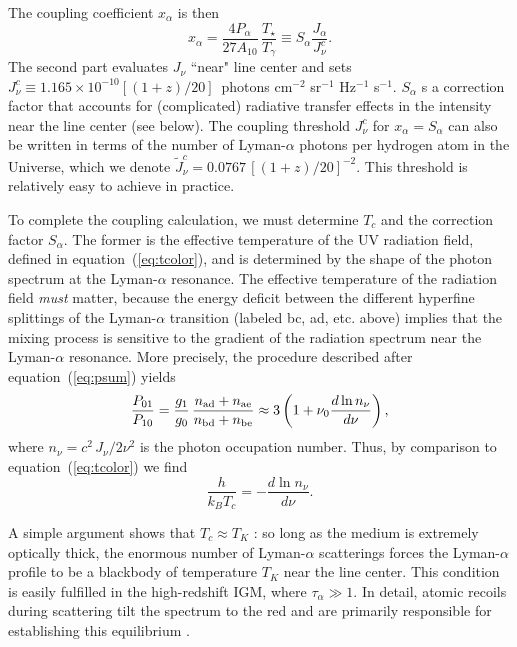 The coupling coefficient $x_\alpha$ is then
\begin{equation}
x_\alpha = \frac{4 P_\alpha}{27 A_{10}} \, \frac{T_\star}{T_{\gamma}} \equiv S_\alpha \frac{J_\alpha}{J_\nu^c}.
\label{eq:xalpha}
\end{equation}
The second part evaluates $J_\nu$ ``near" line center and sets $J_\nu^c \equiv 1.165 \times 10^{-10} [(1+z)/20]$~photons cm$^{-2}$ sr$^{-1}$ Hz$^{-1}$ s$^{-1}$.   $S_\alpha$ s a correction factor that accounts for (complicated) radiative transfer effects in the intensity near the line center (see below).  The coupling threshold $J_\nu^c$ for $x_\alpha = S_\alpha$ can also be written in terms of the number of Lyman-$\alpha$ photons per hydrogen atom in the Universe, which we denote $\tilde{J}_\nu^c = 0.0767 \, [(1+z)/20]^{-2}$.  This threshold is relatively easy to achieve in practice.

To complete the coupling calculation, we must determine $T_c$ and the correction factor $S_\alpha$.  The former is the effective temperature of the UV radiation field, defined in equation~(\ref{eq:tcolor}), and is determined by the shape of the photon spectrum at the Lyman-$\alpha$ resonance. The effective temperature of the radiation field \emph{must} matter, because the energy deficit between the different hyperfine splittings of the Lyman-$\alpha$ transition (labeled bc, ad, etc. above) implies that the mixing process is sensitive to the gradient of the radiation spectrum near the Lyman-$\alpha$ resonance.  More precisely, the procedure described after equation~(\ref{eq:psum}) yields
\begin{equation}
\frac{P_{01}}{P_{10}} = \frac{g_1}{g_0} \, \frac{n_{\rm ad} + n_{\rm ae}}{n_{\rm bd} + n_{\rm be}} \approx 3 \left( 1 + \nu_0 \frac{d \ln n_\nu}{d \nu} \right),
\label{eq:tcrad1}
\end{equation}
where $n_\nu = c^2 \, J_\nu/2 \nu^2$ is the photon occupation number.
Thus, by comparison to equation~(\ref{eq:tcolor}) we find
\begin{equation}
\frac{h}{k_B T_c} = - \frac{d \ln n_\nu}{d \nu}.
\label{eq:tcrad}
\end{equation}

A simple argument shows that $T_c \approx T_K$ \cite{field59-ts}: so long as the medium is extremely optically thick, the enormous number of Lyman-$\alpha$ scatterings forces the Lyman-$\alpha$ profile to be a blackbody of temperature $T_K$ near the line center.  This condition is easily fulfilled in the high-redshift IGM, where $\tau_\alpha \gg 1$.  In detail, atomic recoils during scattering tilt the spectrum to the red and are primarily responsible for establishing this equilibrium \cite{field59-res}.  

